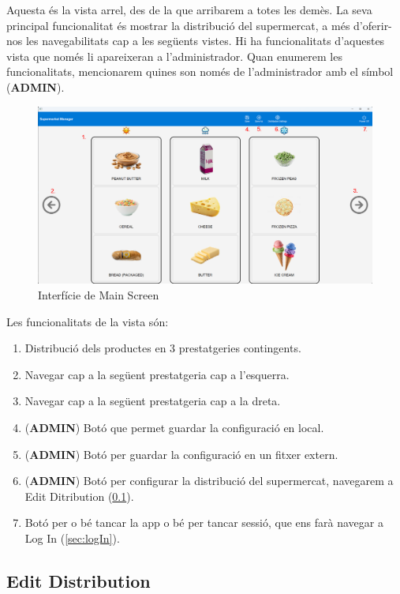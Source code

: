 \documentclass[a4paper,12pt]{article}
\begin{document}
	Aquesta és la vista arrel, des de la que arribarem a totes les demès. La seva principal funcionalitat és mostrar la distribució del supermercat, a més d'oferir-nos les navegabilitats cap a les següents vistes. Hi ha funcionalitats d'aquestes vista que només li apareixeran a l'administrador. Quan enumerem les funcionalitats, mencionarem quines son només de l'administrador amb el símbol (\textbf{ADMIN}).
	
	\begin{figure}[H] 
		\centering
		\includegraphics[width=0.75\linewidth]{assets/mainscreen.png}
		\caption{Interfície de Main Screen}
	\end{figure}
	
	\noindent Les funcionalitats de la vista són:
	
	\begin{enumerate}[itemsep=0pt, topsep=0pt]
		\item Distribució dels productes en 3 prestatgeries contingents.
		\item Navegar cap a la següent prestatgeria cap a l'esquerra.
		\item Navegar cap a la següent prestatgeria cap a la dreta.
		\item (\textbf{ADMIN}) Botó que permet guardar la configuració en local.
		\item (\textbf{ADMIN}) Botó per guardar la configuració en un fitxer extern.
		\item (\textbf{ADMIN}) Botó per configurar la distribució del supermercat, navegarem a Edit Ditribution (\ref{sec:editDistribution}).
		\item Botó per o bé tancar la app o bé per tancar sessió, que ens farà navegar a Log In (\ref{sec:logIn}).
	\end{enumerate}
	
	\newpage
	\subsection{Edit Distribution}
	\label{sec:editDistribution}
	
\end{document}
